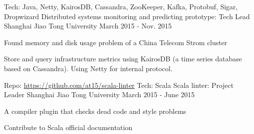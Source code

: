 \begin{cventries}
  \cventry
    {Tech: Java, Netty, KairosDB, Cassandra, ZooKeeper, Kafka, Protobuf, Sigar, Dropwizard}
    {Distributed systems monitoring and predicting prototype: Tech Lead} %
    {Shanghai Jiao Tong University} %
    {March 2015 - Nov. 2015} %
    {
      \begin{cvitems} %
        \item {Found memory and disk usage problem of a China Telecom Strom cluster}
        \item {Store and query infrastructure metrics using KairosDB (a time series database based on Cassandra). Using Netty for internal protocol.}
      \end{cvitems}
    }

    \cventry
      { Repo: \url{https://github.com/at15/scala-linter} Tech: Scala}
      {Scala linter: Project Leader} %
      {Shanghai Jiao Tong University} %
      {March 2015 - June 2015} %
      {
        \begin{cvitems} %
          \item {A compiler plugin that checks dead code and style problems}
          \item {Contribute to Scala official documentation}
        \end{cvitems}
      }


\end{cventries}
